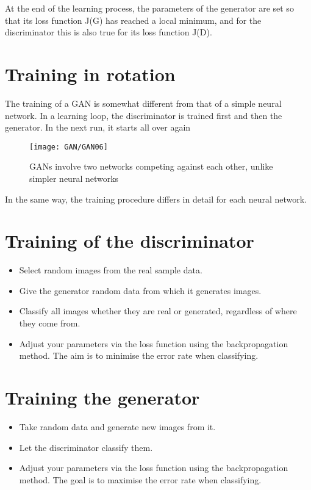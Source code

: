 At the end of the learning process, the parameters of the generator are set so that its loss function J(G) has reached a local minimum, and for the discriminator this is also true for its loss function J(D).

\section{Training in rotation}

The training of a GAN is somewhat different from that of a simple neural network. In a learning loop, the discriminator is trained first and then the generator. In the next run, it starts all over again


\begin{figure}
	\texttt{[image: GAN/GAN06]}
	\caption{GANs involve two networks competing against each other, unlike simpler neural networks} 
	\label{GAN06}
\end{figure}

In the same way, the training procedure differs in detail for each neural network.



\section{Training of the discriminator}

\begin{itemize}
	\item Select random images from the real sample data.
	\item Give the generator random data from which it generates images.
	\item Classify all images whether they are real or generated, regardless of where they come from.
	\item Adjust your parameters via the loss function using the backpropagation method. The aim is to minimise the error rate when classifying.
\end{itemize}


\section{Training the generator}

\begin{itemize}
	\item Take random data and generate new images from it.
	\item Let the discriminator classify them.
	\item Adjust your parameters via the loss function using the backpropagation method. The goal is to maximise the error rate when classifying.
\end{itemize}

